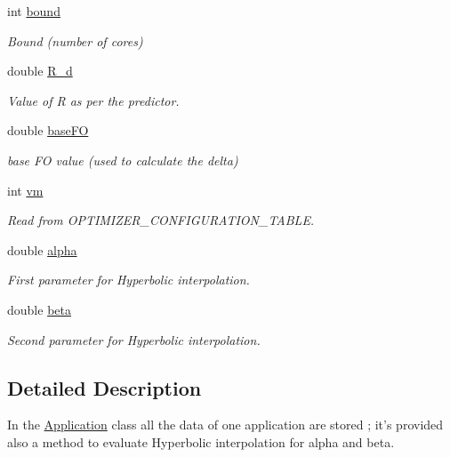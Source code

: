 \begin{DoxyCompactItemize}
int \hyperlink{classApplication_a6e91bef9d503af0e8ba38c8f445c8cb0}{bound}
\begin{DoxyCompactList}\small\item\em Bound (number of cores) \end{DoxyCompactList}\item 
double \hyperlink{classApplication_a374d43f68ae27aaed98278e8152a434c}{R\-\_\-d}
\begin{DoxyCompactList}\small\item\em Value of R as per the predictor. \end{DoxyCompactList}\item 
double \hyperlink{classApplication_aa703e7525d446d98b5cd51c959d35998}{base\-F\-O}
\begin{DoxyCompactList}\small\item\em base F\-O value (used to calculate the delta) \end{DoxyCompactList}\item 
int \hyperlink{classApplication_a0a3fe386eb8244e536bc5297709d1269}{vm}
\begin{DoxyCompactList}\small\item\em Read from O\-P\-T\-I\-M\-I\-Z\-E\-R\-\_\-\-C\-O\-N\-F\-I\-G\-U\-R\-A\-T\-I\-O\-N\-\_\-\-T\-A\-B\-L\-E. \end{DoxyCompactList}\item 
double \hyperlink{classApplication_a57e16d80835a1911b72c63d5eeb5d2f2}{alpha}
\begin{DoxyCompactList}\small\item\em First parameter for Hyperbolic interpolation. \end{DoxyCompactList}\item 
double \hyperlink{classApplication_a356ffae49ae223b3d98b57e56210e3a9}{beta}
\begin{DoxyCompactList}\small\item\em Second parameter for Hyperbolic interpolation. \end{DoxyCompactList}\end{DoxyCompactItemize}


\subsection{Detailed Description}
In the \hyperlink{classApplication}{Application} class all the data of one application are stored ; it's provided also a method to evaluate Hyperbolic interpolation for alpha and beta. 


